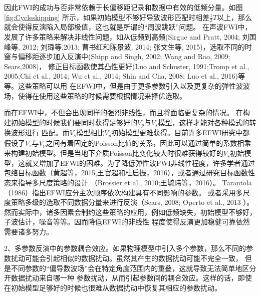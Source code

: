 因此FWI的成功与否非常依赖于长偏移距记录和数据中有效的低频分量。如图\ref{fig:Cycleskipping}
所示，如果初始模型不够好导致波形匹配时相差$\frac{1}{2}T$以上，那么就会使得反演陷入局部极值，这也就是所谓的“周波跳跃”问题。
在声波FWI中，发展了许多策略来解决非线性问题，如从低频到高频(Sirgue and
Pratt, 2004\cite{sirgue.pratt:2004}; 刘国峰等, 2012\cite{刘国峰2012};
刘璐等,2013\cite{刘璐2013}; 曹书红和陈景波, 2014\cite{曹书红2014}; 
张文生等, 2015\cite{张文生2015})，选取不同的时窗与偏移距逐步加入反演中(Shipp and
Singh, 2002\cite{shipp:2002}; Wang and Rao, 2009\cite{WangEtAl2009}; Sears,2008\cite{sears2008})，
修正目标函数使其凸性更好(Luo and Schuster, 1991\cite{luo1991};Tromp et al.,
2005\cite{tromp2005seismic};Chi
et al., 2014\cite{ChiEtAl2014}; Wu et al., 2014\cite{Wu2014b}; Shin and Cha,
2008\cite{shin.cha:2008}; Luo et al., 2016\cite{Luo2016})等等。这些策略可以用
在EFWI中，但是由于更多参数引入以及更复杂的弹性波波场，使得在使用这些策略的时候需要根据情况来择优选取。

而在EFWI中，不但会出现同样的强烈非线性，而且将面临更复杂的情况。
在构建初始模型的时候我们要同时获得足够好的$V_p$与$V_s$模型，这样才能对各种模式的转换波形进行
匹配。而$V_s$模型相比$V_p$初始模型更难获得。目前许多EFWI研究中都假设了$V_s$与$V_p$之间有着固定的Poisson比值的关系，因此可以通过简单的系数相乘
来构建初始模型。但是当地下介质Poisson比变化较大时很难获得较好的$V_s$初始模型，这就又增加了EFWI的困难。为了降低弹性波FWI非线性程度，许多学者通过
包络目标函数（黄超等，2015\cite{黄超2015},王官超和杜启振，2016\cite{王官超2016}），或者通过研究目标函数性态来指导多尺度策略的设计
（Brossier et al., 2010\cite{BrossierEtAl2010};王毓玮等，2016\cite{王毓玮2016}）。
Tarantola（1986）\cite{tarantola:1986}指出EFWI应分主次顺序依次构建具有不同影响的参数。
或者采用多尺度策略多级的选取不同数据分量来进行反演（Sears, 2008\cite{sears2008}; Operto et al., 2013
\cite{operto2013guided}）。然而实际中，诸多因素会制约这些策略的应用，例如低频缺失，初始模型不够好，子波估计，噪音等等。因而降低EFWI的非线性
程度使得反演更加稳健可靠依然需要诸多努力。

2、多参数反演中的参数耦合效应。如果物理模型中引入多个参数，那么不同的参数扰动可能会引起相似的数据扰动。虽然其产生的数据扰动可能不完全一致，
但是不同参数的“偏导数波场\cite{pratt1998gauss}”会在特定角度范围内的重叠，这就导致无法简单地区分开数据扰动来自哪一种
参数扰动，从而引起参数间的耦合效应。这样的话，即使在初始模型足够好的时候也很难从数据扰动中恢复其相应的参数扰动。

